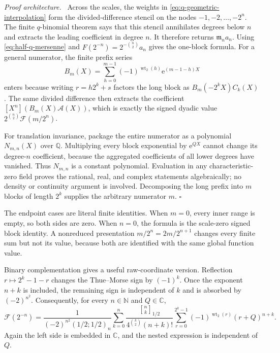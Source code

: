 \documentclass[11pt,oneside]{article}
\theoremstyle{definition}
\theoremstyle{remark}
\newcommand{\C}{\mathbb C}
\newcommand{\Q}{\mathbb Q}
\newcommand{\N}{\mathbb N}
\newcommand{\wt}{\operatorname{wt}_2}
\newcommand{\e}{\mathrm e}
\newcommand{\qbinom}[3]{\genfrac{[}{]}{0pt}{}{#1}{#2}_{#3}}
\newenvironment{proofidea}{\par\smallskip\noindent\textit{Proof architecture.}\ }{\hfill$\square$\par\smallskip}
\begin{document}
\begin{proofidea}
Across the scales, the weights in \eqref{eq:q-geometric-interpolation} form the
divided-difference stencil on the nodes $-1,-2,\ldots,-2^n$.  The finite
$q$-binomial theorem says that this stencil annihilates degrees below $n$ and extracts the
leading coefficient in degree $n$.  It therefore returns $\mathfrak m_na_n$.  Using
\eqref{eq:half-q-mersenne} and
$F(2^{-n})=2^{-\binom n2}a_n$ gives the one-block formula.  For a general numerator, the
finite prefix series
\begin{equation*}
 B_m(X)=\sum_{h=0}^{m-1}(-1)^{\wt(h)}\e^{(m-1-h)X}
\end{equation*}
enters because writing $r=h2^k+s$ factors the long block as
$B_m(-2^kX)C_k(X)$.  The same divided difference then extracts the coefficient
$[X^n](B_m(X)\mathscr A(X))$, which is exactly the signed dyadic value
$2^{\binom n2}\mathcal F(m/2^n)$.

For translation invariance, package the entire numerator as a polynomial $N_{m,n}(X)$ over
$\Q$.  Multiplying every block exponential by $\e^{QX}$ cannot change its degree-$n$
coefficient, because the aggregated coefficients of all lower degrees have vanished.  Thus
$N_{m,n}$ is a constant polynomial.  Evaluation in any characteristic-zero field proves the
rational, real, and complex statements algebraically; no density or continuity argument is
involved.  Decomposing the long prefix into $m$ blocks of length $2^k$ supplies the arbitrary
numerator $m$.
\end{proofidea}

The endpoint cases are literal finite identities.  When $m=0$, every inner range is empty,
so both sides are zero.  When $n=0$, the formula is the scale-zero signed block identity.
A nonreduced presentation $m/2^n=2m/2^{n+1}$ changes every finite sum but not its value,
because both are identified with the same global function value.

Binary complementation gives a useful raw-coordinate version.  Reflection
$r\mapsto2^k-1-r$ changes the Thue--Morse sign by $(-1)^k$.  Once the exponent $n+k$ is
included, the remaining sign is independent of $k$ and is absorbed by $(-2)^{n^2}$.
Consequently, for every $n\in\N$ and $Q\in\C$,
\begin{equation}
 \boxed{
 \mathcal F(2^{-n})=
 \frac{1}{(-2)^{n^2}(1/2;1/2)_n}
 \sum_{k=0}^{n}
 \frac{\qbinom nk{1/2}}{4^{\binom k2}(n+k)!}
 \sum_{r=0}^{2^k-1}(-1)^{\wt(r)}(r+Q)^{n+k}.}
                                                               \label{eq:qbinomial-raw}
\end{equation}
Again the left side is embedded in $\C$, and the nested expression is independent of $Q$.
\end{document}
